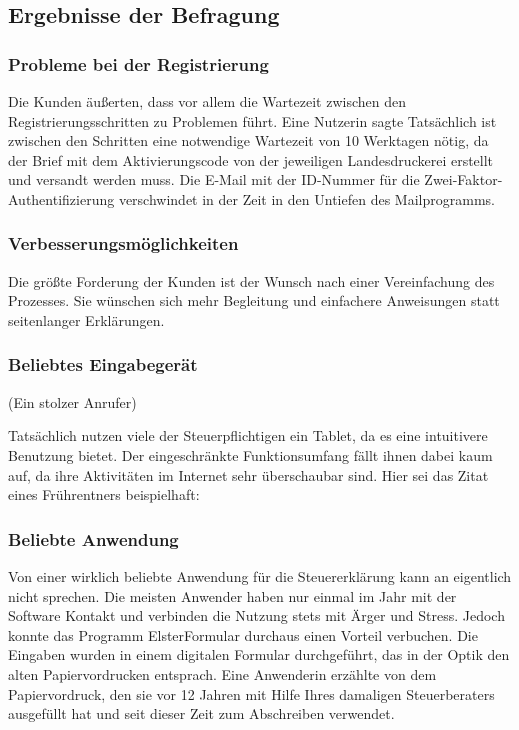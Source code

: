 \subsection{Ergebnisse der Befragung}\label{Ergebnisse der Befragung}

\subsubsection{Probleme bei der Registrierung}
Die Kunden äußerten, dass vor allem die Wartezeit zwischen den Registrierungsschritten zu Problemen führt. Eine Nutzerin sagte  Tatsächlich ist zwischen den Schritten eine notwendige Wartezeit von 10 Werktagen nötig, da der Brief mit dem Aktivierungscode von der jeweiligen Landesdruckerei erstellt und versandt werden muss. Die E-Mail mit der ID-Nummer für die Zwei-Faktor-Authentifizierung verschwindet in der Zeit in den Untiefen des Mailprogramms.

\subsubsection{Verbesserungsmöglichkeiten}
Die größte Forderung der Kunden ist der Wunsch nach einer Vereinfachung des Prozesses. Sie wünschen sich mehr Begleitung und einfachere Anweisungen statt seitenlanger Erklärungen.

\subsubsection{Beliebtes Eingabegerät}
 (Ein stolzer Anrufer)

 Tatsächlich nutzen viele der Steuerpflichtigen ein Tablet, da es eine intuitivere Benutzung bietet. Der eingeschränkte Funktionsumfang fällt ihnen dabei kaum auf, da ihre Aktivitäten im Internet sehr überschaubar sind. Hier sei das Zitat eines Frührentners beispielhaft: 

\subsubsection{Beliebte Anwendung}
Von einer wirklich \grq{}beliebte\grq{} Anwendung für die Steuererklärung kann an eigentlich nicht sprechen. Die meisten Anwender haben nur einmal im Jahr mit der Software Kontakt und verbinden die Nutzung stets mit Ärger und Stress. Jedoch konnte das Programm \grq{}ElsterFormular\grq{} durchaus einen Vorteil verbuchen. Die Eingaben wurden in einem digitalen Formular durchgeführt, das in der Optik den alten Papiervordrucken entsprach. Eine Anwenderin erzählte von dem Papiervordruck, den sie vor 12 Jahren mit Hilfe Ihres damaligen Steuerberaters ausgefüllt hat und seit dieser Zeit zum Abschreiben verwendet.

